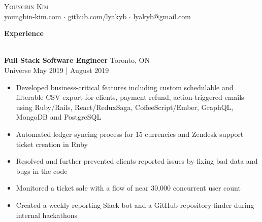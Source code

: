 \documentclass[a4paper]{article}
\newcommand{\lineunder} {
    \vspace{-8pt} \\
    \hspace{-18pt} \hrulefill \\
}
\newcommand{\header} [1] {
    {\hspace{-18pt}\vspace*{6pt} \textcolor{headerGray}{\textbf{\large{#1}}}}
    \vspace{-6pt} \lineunder
}
\begin{document}
\raggedright
\vspace{-12cm}



\begin{center}
	{\Huge \scshape {Youngbin Kim}}\\
	youngbin-kim.com $\cdot$ github.com/lyakyb $\cdot$ lyakyb@gmail.com\\
\end{center}

\vspace{3mm}
\header{Experience}
\vspace{1mm}

\textbf{\normalsize Full Stack Software Engineer} \hfill Toronto, ON\\
\textcolor{jobGray}{Universe} \hfill \textcolor{dateGray}{May 2019 | August 2019}\\
\vspace{-2mm}
\begin{itemize}[leftmargin=1cm ] \itemsep -0.5pt
	\item Developed business-critical features including custom schedulable and filterable CSV export for clients, payment refund, action-triggered emails using Ruby/Rails, React/ReduxSaga, CoffeeScript/Ember, GraphQL, MongoDB and PostgreSQL  
	\item Automated ledger syncing process for 15 currencies and Zendesk support ticket creation in Ruby
	\item Resolved and further prevented clients-reported issues by fixing bad data and bugs in the code
	\item Monitored a ticket sale with a flow of near 30,000 concurrent user count
	\item Created a weekly reporting Slack bot and a GitHub repository finder during internal hackathons 
\end{itemize}
\end{document}
